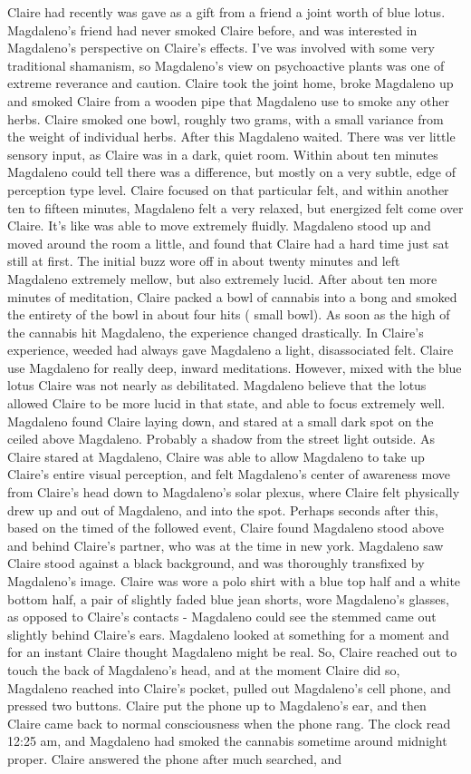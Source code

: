 \documentclass[12pt]{book}
\begin{document}
Claire had recently was gave as a gift from a friend a joint worth of blue lotus. Magdaleno's friend had never smoked Claire before, and was interested in Magdaleno's perspective on Claire's effects. I've was involved with some very traditional shamanism, so Magdaleno's view on psychoactive plants was one of extreme reverance and caution. Claire took the joint home, broke Magdaleno up and smoked Claire from a wooden pipe that Magdaleno use to smoke any other herbs. Claire smoked one bowl, roughly two grams, with a small variance from the weight of individual herbs. After this Magdaleno waited. There was ver little sensory input, as Claire was in a dark, quiet room. Within about ten minutes Magdaleno could tell there was a difference, but mostly on a very subtle, edge of perception type level. Claire focused on that particular felt, and within another ten to fifteen minutes, Magdaleno felt a very relaxed, but energized felt come over Claire. It's like was able to move extremely fluidly. Magdaleno stood up and moved around the room a little, and found that Claire had a hard time just sat still at first. The initial buzz wore off in about twenty minutes and left Magdaleno extremely mellow, but also extremely lucid. After about ten more minutes of meditation, Claire packed a bowl of cannabis into a bong and smoked the entirety of the bowl in about four hits ( small bowl). As soon as the high of the cannabis hit Magdaleno, the experience changed drastically. In Claire's experience, weeded had always gave Magdaleno a light, disassociated felt. Claire use Magdaleno for really deep, inward meditations. However, mixed with the blue lotus Claire was not nearly as debilitated. Magdaleno believe that the lotus allowed Claire to be more lucid in that state, and able to focus extremely well. Magdaleno found Claire laying down, and stared at a small dark spot on the ceiled above Magdaleno. Probably a shadow from the street light outside. As Claire stared at Magdaleno, Claire was able to allow Magdaleno to take up Claire's entire visual perception, and felt Magdaleno's center of awareness move from Claire's head down to Magdaleno's solar plexus, where Claire felt physically drew up and out of Magdaleno, and into the spot. Perhaps seconds after this, based on the timed of the followed event, Claire found Magdaleno stood above and behind Claire's partner, who was at the time in new york. Magdaleno saw Claire stood against a black background, and was thoroughly transfixed by Magdaleno's image. Claire was wore a polo shirt with a blue top half and a white bottom half, a pair of slightly faded blue jean shorts, wore Magdaleno's glasses, as opposed to Claire's contacts - Magdaleno could see the stemmed came out slightly behind Claire's ears. Magdaleno looked at something for a moment and for an instant Claire thought Magdaleno might be real. So, Claire reached out to touch the back of Magdaleno's head, and at the moment Claire did so, Magdaleno reached into Claire's pocket, pulled out Magdaleno's cell phone, and pressed two buttons. Claire put the phone up to Magdaleno's ear, and then Claire came back to normal consciousness when the phone rang. The clock read 12:25 am, and Magdaleno had smoked the cannabis sometime around midnight proper. Claire answered the phone after much searched, and 
\end{document}
